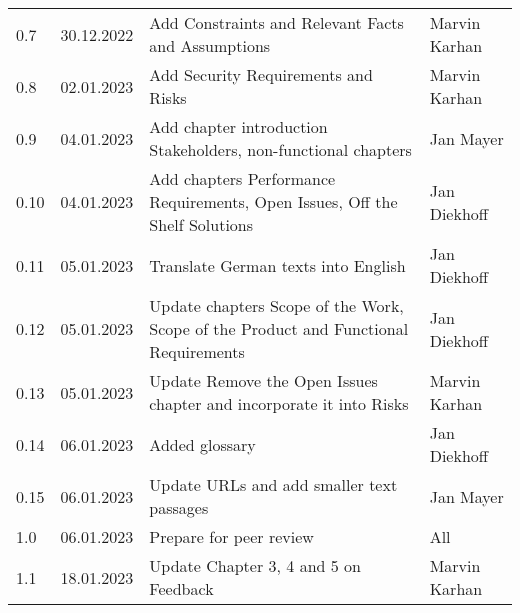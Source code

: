 \begin{footnotesize}
\begin{longtable}[L L L L]{ p{} p{} p{} p{} }
    0.7              & 30.12.2022    & Add Constraints and Relevant Facts and Assumptions                                                                                            & Marvin Karhan   \\

    0.8              & 02.01.2023    & Add Security Requirements and Risks                                                                                                           & Marvin Karhan   \\

    0.9              & 04.01.2023    & Add chapter introduction Stakeholders, non-functional chapters                                                                                & Jan Mayer       \\

    0.10             & 04.01.2023    & Add chapters Performance Requirements, Open Issues, Off the Shelf Solutions                                                                   & Jan Diekhoff    \\

    0.11             & 05.01.2023    & Translate German texts into English                                                                                                           & Jan Diekhoff    \\

    0.12             & 05.01.2023    & Update chapters Scope of the Work, Scope of the Product and Functional Requirements                                                           & Jan Diekhoff    \\

    0.13             & 05.01.2023    & Update Remove the Open Issues chapter and incorporate it into Risks                                                                           & Marvin Karhan   \\

    0.14             & 06.01.2023    & Added glossary                                                                                                                                & Jan Diekhoff    \\

    0.15             & 06.01.2023    & Update URLs and add smaller text passages                                                                                                     & Jan Mayer       \\
    1.0              & 06.01.2023    & Prepare for peer review                                                                                                                       & All             \\
    1.1              & 18.01.2023    & Update Chapter 3, 4 and 5 on Feedback                                                                                                         & Marvin Karhan   \\

    \bottomrule
  \end{longtable}
\end{footnotesize}
\rmfamily